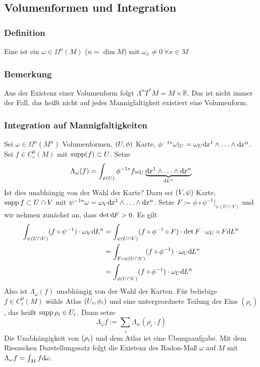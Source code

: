 
\subsection{Volumenformen und Integration}
\label{sub:112}

\subsubsection{Definition}
\label{ssub:197}
Eine  ist ein $\omega \in \Omega^n (M)$ ($n = \dim M$) mit $\omega_x \neq 0\ \forall x\in M$

\subsubsection{Bemerkung}
\label{ssub:198}
Aus der Existenz einer Volumenform folgt $\Lambda^n T^* M = M\times \mathds{R}$. Das ist nicht immer der Fall, das heißt nicht auf jedes Mannigfaltigkeit existiert eine Volumenform.

\subsubsection{Integration auf Mannigfaltigkeiten}
\label{ssub:199}
Sei $\omega \in \Omega^n (M^n)$ Volumenformen, $(U,\phi)$ Karte, $\phi^{-1*} \omega \vert_U = \omega_U \mathrm{d}\mkern-1.0mu x^1 \wedge \ldots \wedge \mathrm{d}\mkern-1.0mu x^n$. Sei $f\in C_c^0 (M)$ mit $\operatorname{supp}(f) \subset U$. Setze 
\[
\Lambda_\omega (f) = \int_{\phi(U)} \phi^{-1*} f \omega_U \underbrace{\mathrm{d}\mkern-1.0mu x^1 \wedge \ldots \wedge \mathrm{d}\mkern-1.0mu x^n}_{\mathrm{d}\mkern-1.0mu L^n}
\]
Ist dies unabhängig von der Wahl der Karte? Dazu sei $(V,\psi)$ Karte, $\operatorname{supp} f \subset U\cap V$ mit $\psi^{-1*} \omega = \omega_V  \mathrm{d}\mkern-1.0mu x^1\wedge \ldots \wedge \mathrm{d}\mkern-1.0mu x^n$. Setze $F := \phi \circ \psi^{-1}\vert_{\psi(U\cap V)}$ und wir nehmen zunächst an, dass $\det \mathrm{d}\mkern-1.0mu F > 0$. Es gilt
\begin{align*}
\int_{\psi(U\cap V)} (f\circ \psi^{-1}) \cdot \omega_V \mathrm{d}\mkern-1.0mu L^n &= \int_{\psi(U\cap V)} (f\circ \phi^{-1}\circ F)\cdot \det F \cdot \omega_U \circ F \mathrm{d}\mkern-1.0mu L^n\\
&= \int_{F\circ \psi(U\cap V)} (f\circ \phi^{-1}) \cdot \omega_U \mathrm{d}\mkern-1.0mu L^n\\
&= \int_{\phi(U\cap V)} (f\circ \phi^{-1}) \cdot \omega_U \mathrm{d}\mkern-1.0mu L^n
\end{align*}
Also ist $\Lambda_\omega (f)$ unabhängig von der Wahl der Karten. Für beliebige $f\in C_c^0 (M)$ wähle Atlas $(U_i,\phi_i)$ und eine untergeordnete Teilung der Eins $(\rho_i)$, das heißt $\operatorname{supp} \rho_i \in U_i$. Dann setze
\[
\Lambda_\omega f := \sum_i \Lambda_w (\rho_i \cdot f)
\]
Die Unabhängigkeit von $(\rho_i)$ und dem Atlas ist eine Übungsaufgabe. Mit dem Rieszschen Darstellungssatz folgt die Existenz des Radon-Maß $\omega$ auf $M$ mit $\Lambda_\omega f = \int_M f \mathrm{d}\mkern-1.0mu \omega$.

